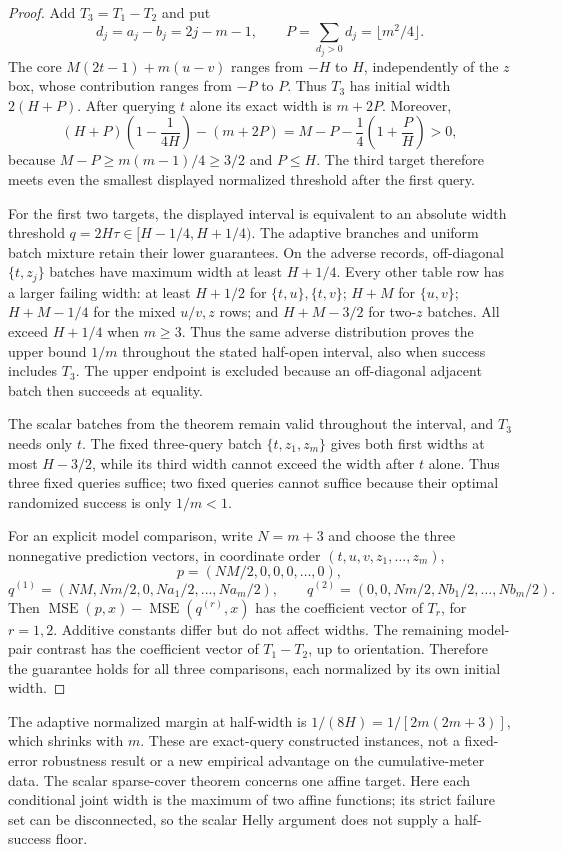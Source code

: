 \begin{proof}
Add $T_3=T_1-T_2$ and put
\[
 d_j=a_j-b_j=2j-m-1,\qquad
 P=\sum_{d_j>0}d_j=\lfloor m^2/4\rfloor.
\]
The core $M(2t-1)+m(u-v)$ ranges from $-H$ to $H$, independently of
the $z$ box, whose contribution ranges from $-P$ to $P$. Thus $T_3$ has
initial width $2(H+P)$. After querying $t$ alone its exact width is
$m+2P$. Moreover,
\[
 (H+P)\left(1-\frac1{4H}\right)-(m+2P)
 =M-P-\frac14\left(1+\frac PH\right)>0,
\]
because $M-P\geq m(m-1)/4\geq3/2$ and $P\leq H$.
The third target therefore meets even the smallest displayed normalized
threshold after the first query.

For the first two targets, the displayed interval is equivalent to an
absolute width threshold $q=2H\tau\in[H-1/4,H+1/4)$. The adaptive
branches and uniform batch mixture retain their lower guarantees.
On the adverse records, off-diagonal $\{t,z_j\}$ batches have maximum
width at least $H+1/4$. Every other table row has a larger failing width:
at least $H+1/2$ for $\{t,u\},\{t,v\}$;
$H+M$ for $\{u,v\}$; $H+M-1/4$ for the mixed $u/v,z$ rows;
and $H+M-3/2$ for two-$z$ batches. All exceed $H+1/4$ when $m\geq3$.
Thus the same adverse distribution proves the upper bound $1/m$
throughout the stated half-open interval, also when success includes $T_3$.
The upper endpoint is excluded because an off-diagonal adjacent batch
then succeeds at equality.

The scalar batches from the theorem remain valid throughout the interval,
and $T_3$ needs only $t$. The fixed three-query batch $\{t,z_1,z_m\}$
gives both first widths at most $H-3/2$, while its third width cannot
exceed the width after $t$ alone. Thus three fixed queries suffice;
two fixed queries cannot suffice because their optimal randomized success
is only $1/m<1$.

For an explicit model comparison, write $N=m+3$ and choose the three
nonnegative prediction vectors, in coordinate order $(t,u,v,z_1,\ldots,z_m)$,
\[
 p=(NM/2,0,0,0,\ldots,0),
\]
\[
 q^{(1)}=(NM,Nm/2,0,Na_1/2,\ldots,Na_m/2),\qquad
 q^{(2)}=(0,0,Nm/2,Nb_1/2,\ldots,Nb_m/2).
\]
Then $\operatorname{MSE}(p,x)-\operatorname{MSE}(q^{(r)},x)$ has
the coefficient vector of $T_r$, for $r=1,2$. Additive constants differ
but do not affect widths. The remaining model-pair contrast has the
coefficient vector of $T_1-T_2$, up to orientation. Therefore the guarantee
holds for all three comparisons, each normalized by its own initial width.
\end{proof}

The adaptive normalized margin at half-width is
$1/(8H)=1/[2m(2m+3)]$, which shrinks with $m$. These are exact-query
constructed instances, not a fixed-error robustness result or a new
empirical advantage on the cumulative-meter data. The scalar sparse-cover
theorem concerns one affine target. Here each conditional joint width is
the maximum of two affine functions; its strict failure set can be
disconnected, so the scalar Helly argument does not supply a half-success
floor.
